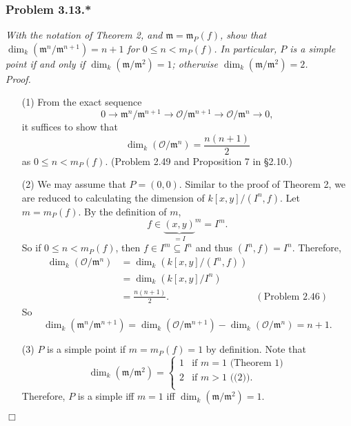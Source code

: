 \documentclass{article}
\begin{document}



\subsubsection*{Problem 3.13.*}
\emph{With the notation of Theorem 2, and $\mathfrak{m} = \mathfrak{m}_P(f)$,
show that $\dim_k(\mathfrak{m}^n/\mathfrak{m}^{n+1}) = n+1$ for $0 \leq n < m_P(f)$.
In particular, $P$ is a simple point if and only if $\dim_k(\mathfrak{m}/\mathfrak{m}^2) = 1$;
otherwise $\dim_k(\mathfrak{m}/\mathfrak{m}^2) = 2$.} \\



\emph{Proof.}
\begin{enumerate}
\item[(1)]
  From the exact sequence
  \[
    0
    \to \mathfrak{m}^{n}/\mathfrak{m}^{n+1}
    \to \mathscr{O}/\mathfrak{m}^{n+1}
    \to \mathscr{O}/\mathfrak{m}^{n}
    \to
    0,
  \]
  it suffices to show that
  \[
    \dim_k(\mathscr{O}/\mathfrak{m}^{n}) = \frac{n(n+1)}{2}
  \]
  as $0 \leq n < m_P(f)$. (Problem 2.49 and Proposition 7 in \S 2.10.)

\item[(2)]
  We may assume that $P = (0,0)$. Similar to the proof of Theorem 2,
  we are reduced to calculating the dimension of $k[x,y]/(I^n,f)$.
  Let $m = m_P(f)$.
  By the definition of $m$,
  \[
    f \in {\underbrace{(x,y)}_{= I }}^{m} = I^{m}.
  \]
  So if $0 \leq n < m_P(f)$, then $f \in I^{m} \subseteq I^n$ and thus $(I^n,f) = I^n$.
  Therefore,
  \begin{align*}
    \dim_k(\mathscr{O}/\mathfrak{m}^{n})
    &= \dim_k(k[x,y]/(I^n,f)) \\
    &= \dim_k(k[x,y]/I^n) \\
    &= \frac{n(n+1)}{2}.
      &(\text{Problem 2.46})
  \end{align*}
  So
  \[
    \dim_k(\mathfrak{m}^n/\mathfrak{m}^{n+1})
    = \dim_k(\mathscr{O}/\mathfrak{m}^{n+1}) - \dim_k(\mathscr{O}/\mathfrak{m}^{n})
    = n + 1.
  \]

\item[(3)]
  $P$ is a simple point if $m = m_P(f) = 1$ by definition.
  Note that
  \begin{equation*}
    \dim_k(\mathfrak{m}/\mathfrak{m}^2) =
    \begin{cases}
      1 & \text{if $m = 1$ (Theorem 1)} \\
      2 & \text{if $m > 1$ ((2))}. \\
    \end{cases}
  \end{equation*}
  Therefore,
  $P$ is a simple iff $m = 1$ iff $\dim_k(\mathfrak{m}/\mathfrak{m}^2) = 1$.
\end{enumerate}
$\Box$ \\\\
\end{document}
